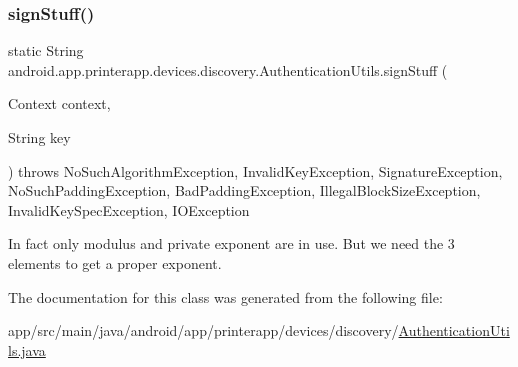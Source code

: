 \subsubsection{\texorpdfstring{sign\+Stuff()}{signStuff()}}
{\footnotesize\ttfamily static String android.\+app.\+printerapp.\+devices.\+discovery.\+Authentication\+Utils.\+sign\+Stuff (\begin{DoxyParamCaption}\item[{Context}]{context,  }\item[{String}]{key }\end{DoxyParamCaption}) throws No\+Such\+Algorithm\+Exception, Invalid\+Key\+Exception, Signature\+Exception, No\+Such\+Padding\+Exception, Bad\+Padding\+Exception, Illegal\+Block\+Size\+Exception, Invalid\+Key\+Spec\+Exception, I\+O\+Exception\hspace{0.3cm}{\ttfamily [static]}}

In fact only modulus and private exponent are in use. But we need the 3 elements to get a proper exponent.

The documentation for this class was generated from the following file\+:\begin{DoxyCompactItemize}
\item 
app/src/main/java/android/app/printerapp/devices/discovery/\hyperlink{_authentication_utils_8java}{Authentication\+Utils.\+java}\end{DoxyCompactItemize}
